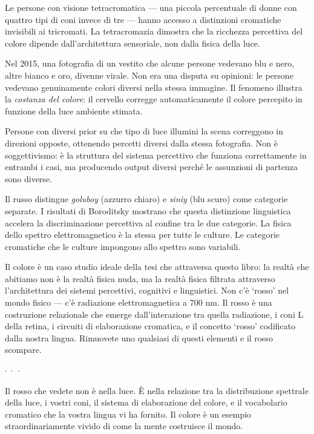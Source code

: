 \documentclass[12pt,a4paper,openany]{book}
\newcommand{\sezione}[1]{\vspace{1.2em}{\large\bfseries #1}\vspace{0.5em}\par}
\newcommand{\puntini}{\begin{center}$\cdot\ \cdot\ \cdot$\end{center}\vspace{0.3em}}
\begin{document}
Le persone con visione tetracromatica --- una piccola percentuale di donne con quattro tipi di coni invece di tre --- hanno accesso a distinzioni cromatiche invisibili ai tricromati. La tetracromazia dimostra che la ricchezza percettiva del colore dipende dall'architettura sensoriale, non dalla fisica della luce.

\sezione{La costanza del colore e il vestito virale}

Nel 2015, una fotografia di un vestito che alcune persone vedevano blu e nero, altre bianco e oro, divenne virale. Non era una disputa su opinioni: le persone vedevano genuinamente colori diversi nella stessa immagine. Il fenomeno illustra la \textit{costanza del colore}: il cervello corregge automaticamente il colore percepito in funzione della luce ambiente stimata.

Persone con diversi prior su che tipo di luce illumini la scena correggono in direzioni opposte, ottenendo percetti diversi dalla stessa fotografia. Non è soggettivismo: è la struttura del sistema percettivo che funziona correttamente in entrambi i casi, ma producendo output diversi perché le assunzioni di partenza sono diverse.

\sezione{Relativismo linguistico e percezione}

Il russo distingue \textit{goluboy} (azzurro chiaro) e \textit{siniy} (blu scuro) come categorie separate. I risultati di Boroditsky mostrano che questa distinzione linguistica accelera la discriminazione percettiva al confine tra le due categorie. La fisica dello spettro elettromagnetico è la stessa per tutte le culture. Le categorie cromatiche che le culture impongono allo spettro sono variabili.

Il colore è un caso studio ideale della tesi che attraversa questo libro: la realtà che abitiamo non è la realtà fisica nuda, ma la realtà fisica filtrata attraverso l'architettura dei sistemi percettivi, cognitivi e linguistici. Non c'è `rosso' nel mondo fisico --- c'è radiazione elettromagnetica a 700 nm. Il rosso è una costruzione relazionale che emerge dall'interazione tra quella radiazione, i coni L della retina, i circuiti di elaborazione cromatica, e il concetto `rosso' codificato dalla nostra lingua. Rimuovete uno qualsiasi di questi elementi e il rosso scompare.

\puntini

Il rosso che vedete non è nella luce. È nella relazione tra la distribuzione spettrale della luce, i vostri coni, il sistema di elaborazione del colore, e il vocabolario cromatico che la vostra lingua vi ha fornito. Il colore è un esempio straordinariamente vivido di come la mente costruisce il mondo.
\end{document}
